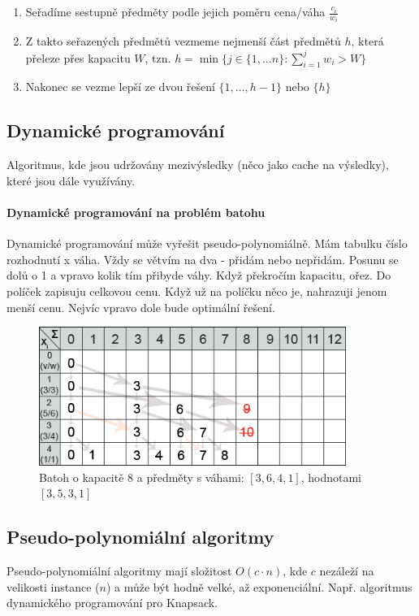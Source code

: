 \begin{enumerate}
\item Seřadíme sestupně předměty podle jejich poměru cena/váha $\frac{c_i}{w_i}$
\item Z takto seřazených předmětů vezmeme nejmenší část předmětů $h$, která přeleze přes kapacitu $W$, tzn. $h = \min\{j \in \{1,\hdots n\} : \sum\limits^{j}_{i = 1} w_i > W\}$
\item Nakonec se vezme lepší ze dvou řešení $\{1,\hdots, h-1\}$ nebo $\{h\}$
\end{enumerate}

\subsection{Dynamické programování}
Algoritmus, kde jsou udržovány mezivýsledky (něco jako cache na výsledky), které jsou dále využívány.

\paragraph{Dynamické programování na problém batohu}
Dynamické programování může vyřešit pseudo-polynomiálně. Mám tabulku číslo rozhodnutí x váha. Vždy se větvím na dva - přidám nebo nepřidám. Posunu se dolů o 1 a vpravo kolik tím přibyde váhy. Když překročím kapacitu, ořez. Do políček zapisuju celkovou cenu. Když už na políčku něco je, nahrazuji jenom menší cenu. Nejvíc vpravo dole bude optimální řešení.

\begin{figure}[h]
    \begin{center}
        \includegraphics[width=100mm]{spolecne/09/images/knapsack}
    \end{center}
    \caption{Batoh o kapacitě 8 a předměty s váhami: $[3,6,4,1]$, hodnotami $[3, 5, 3, 1]$}
\end{figure}

\subsection{Pseudo-polynomiální algoritmy}
Pseudo-polynomiální algoritmy mají složitost $O(c \cdot n)$, kde $c$ nezáleží na velikosti instance ($n$) a může být hodně velké, až exponenciální. Např. algoritmus dynamického programování pro Knapsack.
